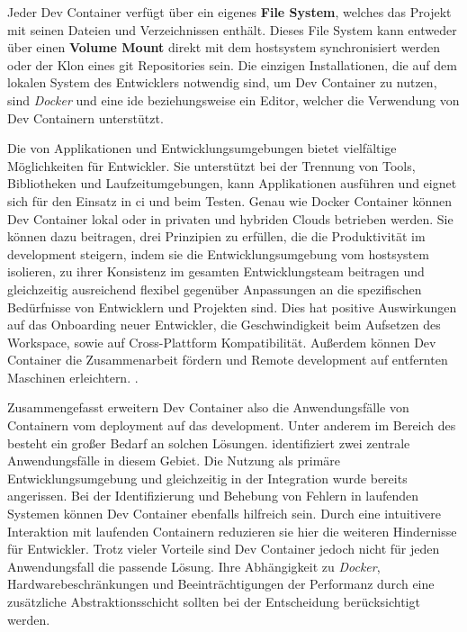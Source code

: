 Jeder Dev Container verfügt über ein eigenes \textbf{File System}, welches das Projekt mit seinen Dateien und Verzeichnissen enthält. Dieses File System kann entweder über einen \textbf{Volume Mount} direkt mit dem \Gls{hostsystem} synchronisiert werden oder der Klon eines \Gls{git} Repositories sein. Die einzigen Installationen, die auf dem lokalen System des Entwicklers notwendig sind, um Dev Container zu nutzen, sind \textit{Docker} und eine \Gls{ide} beziehungsweise ein Editor, welcher die Verwendung von Dev Containern unterstützt.

Die  von Applikationen und Entwicklungsumgebungen bietet vielfältige Möglichkeiten für Entwickler. Sie unterstützt bei der Trennung von Tools, Bibliotheken und Laufzeitumgebungen, kann Applikationen ausführen und eignet sich für den Einsatz in \acrfull{ci} und beim Testen. Genau wie Docker Container können Dev Container lokal oder in privaten und hybriden Clouds betrieben werden. \cite{306:Development-Containers} Sie können dazu beitragen, drei Prinzipien zu erfüllen, die die Produktivität im \Gls{development} steigern, indem sie die Entwicklungsumgebung vom \Gls{hostsystem} isolieren, zu ihrer Konsistenz im gesamten Entwicklungsteam beitragen und gleichzeitig ausreichend flexibel gegenüber Anpassungen an die spezifischen Bedürfnisse von Entwicklern und Projekten sind. Dies hat positive Auswirkungen auf das Onboarding neuer Entwickler, die Geschwindigkeit beim Aufsetzen des Workspace, sowie auf Cross-Plattform Kompatibilität. Außerdem können Dev Container die Zusammenarbeit fördern und Remote \Gls{development} auf entfernten Maschinen erleichtern. \cite{200:Dev-Containers-Future-of-Development-Environments,202:Maximizing-Efficiency-with-Dev-Containers,305:Using-DevContainers-in-JetBrains-IDEs}.

Zusammengefasst erweitern Dev Container also die Anwendungsfälle von Containern vom \Gls{deployment} auf das \Gls{development}. Unter anderem im Bereich des  besteht ein großer Bedarf an solchen Lösungen. \citeauthor{202:Maximizing-Efficiency-with-Dev-Containers} identifiziert zwei zentrale Anwendungsfälle in diesem Gebiet. Die Nutzung als primäre Entwicklungsumgebung und gleichzeitig in der Integration wurde bereits angerissen. Bei der Identifizierung und Behebung von Fehlern in laufenden Systemen können Dev Container ebenfalls hilfreich sein. Durch eine intuitivere Interaktion mit laufenden Containern reduzieren sie hier die weiteren Hindernisse für Entwickler. Trotz vieler Vorteile sind Dev Container jedoch nicht für jeden Anwendungsfall die passende Lösung. Ihre Abhängigkeit zu \textit{Docker}, Hardwarebeschränkungen und Beeinträchtigungen der Performanz durch eine zusätzliche Abstraktionsschicht sollten bei der Entscheidung berücksichtigt werden. \cite{202:Maximizing-Efficiency-with-Dev-Containers}

